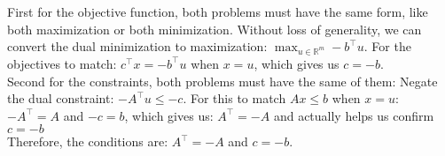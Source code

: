 \documentclass{article}
\begin{document}
First for the objective function, both problems must have the same form, like both maximization or both minimization. Without loss of generality, we can convert the dual minimization to maximization: $\max_{u \in \mathbb{R}^m} -b^{\top} u$.
For the objectives to match: $c^{\top} x = -b^{\top} u$ when $x = u$, which gives us $c = -b$. \\

Second for the constraints, both problems must have the same of them: Negate the dual constraint: $-A^{\top}u \leq -c$. For this to match $Ax \leq b$ when $x = u$: $-A^{\top} = A$ and $-c = b$, which gives us: $A^{\top} = -A$ and actually helps us confirm $c = -b$ \\

Therefore, the conditions are: $A^{\top} = -A$ and $c = -b$.
\end{document}
